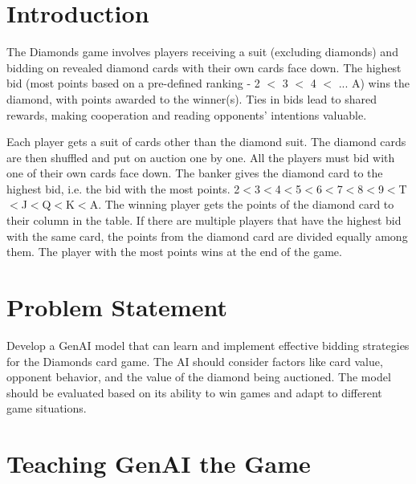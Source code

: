 \documentclass[12pt]{article} %
\begin{document}
\section*{\textbf{Introduction}}

The Diamonds game involves players receiving a suit (excluding diamonds) and bidding on revealed diamond cards with their own cards face down. The highest bid (most points based on a pre-defined ranking - 2 $<$ 3 $<$ 4 $<$ ... A) wins the diamond, with points awarded to the winner(s). Ties in bids lead to shared rewards, making cooperation and reading opponents' intentions valuable.

Each player gets a suit of cards other than the diamond suit. The diamond cards are then shuffled and put on auction one by one. All the players must bid with one of their own cards face down. The banker gives the diamond card to the highest bid, i.e. the bid with the most points. 2$<$3$<$4$<$5$<$6$<$7$<$8$<$9$<$T$<$J$<$Q$<$K$<$A. The winning player gets the points of the diamond card to their column in the table. If there are multiple players that have the highest bid with the same card, the points from the diamond card are divided equally among them. The player with the most points wins at the end of the game.

\section*{\textbf{Problem Statement}}

Develop a GenAI model that can learn and implement effective bidding strategies for the Diamonds card game. The AI should consider factors like card value, opponent behavior, and the value of the diamond being auctioned. The model should be evaluated based on its ability to win games and adapt to different game situations.

\section*{\textbf{Teaching GenAI the Game}}
\end{document}
